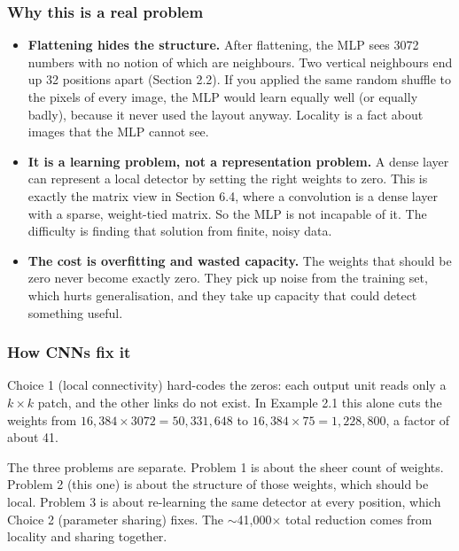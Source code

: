 \subsubsection*{Why this is a real problem}

\begin{itemize}[leftmargin=*]
  \item \textbf{Flattening hides the structure.} After flattening, the MLP sees 3072 numbers with no notion of which are neighbours. Two vertical neighbours end up 32 positions apart (Section 2.2). If you applied the same random shuffle to the pixels of every image, the MLP would learn equally well (or equally badly), because it never used the layout anyway. Locality is a fact about images that the MLP cannot see.
  \item \textbf{It is a learning problem, not a representation problem.} A dense layer can represent a local detector by setting the right weights to zero. This is exactly the matrix view in Section 6.4, where a convolution is a dense layer with a sparse, weight-tied matrix. So the MLP is not incapable of it. The difficulty is finding that solution from finite, noisy data.
  \item \textbf{The cost is overfitting and wasted capacity.} The weights that should be zero never become exactly zero. They pick up noise from the training set, which hurts generalisation, and they take up capacity that could detect something useful.
\end{itemize}

\subsubsection*{How CNNs fix it}

Choice 1 (local connectivity) hard-codes the zeros: each output unit reads only a $k\times k$ patch, and the other links do not exist. In Example 2.1 this alone cuts the weights from $16{,}384 \times 3072 = 50{,}331{,}648$ to $16{,}384 \times 75 = 1{,}228{,}800$, a factor of about 41.

The three problems are separate. Problem 1 is about the sheer count of weights. Problem 2 (this one) is about the structure of those weights, which should be local. Problem 3 is about re-learning the same detector at every position, which Choice 2 (parameter sharing) fixes. The $\sim$41{,}000$\times$ total reduction comes from locality and sharing together.

